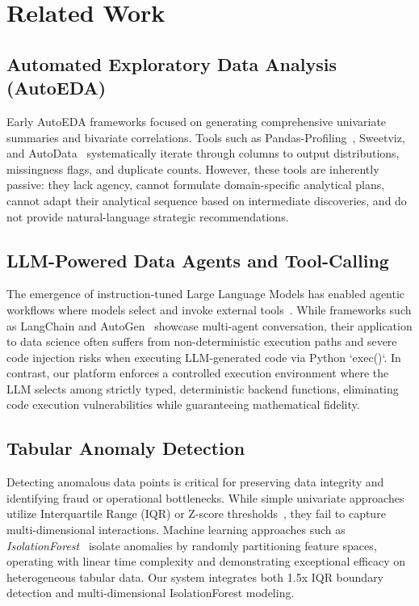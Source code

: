 \documentclass[10pt,journal,compsoc]{IEEEtran}
\begin{document}
\section{Related Work}
\subsection{Automated Exploratory Data Analysis (AutoEDA)}
Early AutoEDA frameworks focused on generating comprehensive univariate summaries and bivariate correlations. Tools such as Pandas-Profiling~\cite{brugman2019pandas}, Sweetviz, and AutoData~\cite{vartak2015seed} systematically iterate through columns to output distributions, missingness flags, and duplicate counts. However, these tools are inherently passive: they lack agency, cannot formulate domain-specific analytical plans, cannot adapt their analytical sequence based on intermediate discoveries, and do not provide natural-language strategic recommendations.

\subsection{LLM-Powered Data Agents and Tool-Calling}
The emergence of instruction-tuned Large Language Models has enabled agentic workflows where models select and invoke external tools~\cite{schick2024toolformer,yao2022react}. While frameworks such as LangChain and AutoGen~\cite{wu2023autogen} showcase multi-agent conversation, their application to data science often suffers from non-deterministic execution paths and severe code injection risks when executing LLM-generated code via Python `exec()`. In contrast, our platform enforces a controlled execution environment where the LLM selects among strictly typed, deterministic backend functions, eliminating code execution vulnerabilities while guaranteeing mathematical fidelity.

\subsection{Tabular Anomaly Detection}
Detecting anomalous data points is critical for preserving data integrity and identifying fraud or operational bottlenecks. While simple univariate approaches utilize Interquartile Range (IQR) or Z-score thresholds~\cite{tukey1977exploratory}, they fail to capture multi-dimensional interactions. Machine learning approaches such as \textit{IsolationForest}~\cite{liu2008isolation} isolate anomalies by randomly partitioning feature spaces, operating with linear time complexity and demonstrating exceptional efficacy on heterogeneous tabular data. Our system integrates both 1.5x IQR boundary detection and multi-dimensional IsolationForest modeling.
\end{document}
